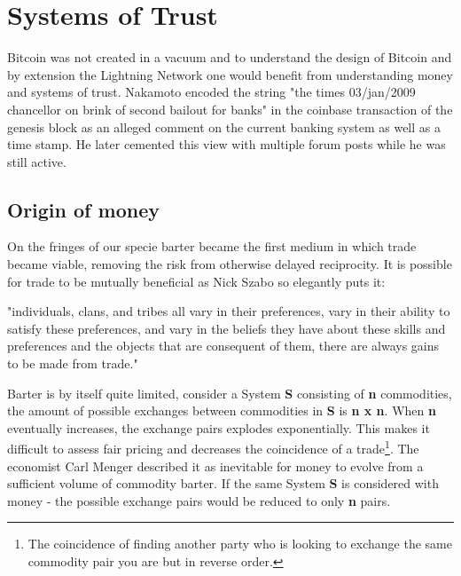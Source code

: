 \section{Systems of Trust}
\label{sec:macroeconomics}

Bitcoin was not created in a vacuum and to understand the design of Bitcoin and by extension the Lightning Network one would
benefit from understanding money and systems of trust. Nakamoto encoded the string "the times 03/jan/2009 chancellor on brink of second bailout for banks"\cite{repository:bitcoin:sourceforge}\cite{bitcoin:genesis:coinbase} in the coinbase transaction of the genesis block as an alleged comment on the current banking system as well as a time stamp. He later cemented this view with multiple forum posts while he was still active\cite{nakamoto:post:deflation}\cite{nakamoto:govern:print}.

\subsection{Origin of money}

On the fringes of our specie barter became the first medium in which trade became viable, removing the risk from otherwise delayed reciprocity. It is possible for trade to be mutually beneficial as Nick Szabo so elegantly puts it:

\begin{displayquote}

"individuals, clans, and tribes all vary in their preferences, vary in their ability to satisfy these preferences, and vary in the beliefs they have about these skills and preferences and the objects that are consequent of them, there are always gains to be made from trade."\cite{szabo:shelling:out}

\end{displayquote}

Barter is by itself quite limited, consider a System \textbf{S}
consisting of \textbf{n} commodities, the amount of possible exchanges between commodities in \textbf{S} is \textbf{n x n}. When \textbf{n} eventually increases, the exchange pairs explodes exponentially. This makes it difficult to assess fair pricing and decreases the coincidence of a trade\footnote{The coincidence of finding another party who is looking to exchange the same commodity pair you are but in reverse order.}. The economist Carl Menger described it as inevitable for money to evolve from a sufficient volume of commodity barter\cite{menger:origins:money}. If the same System \textbf{S} is considered with money - the possible exchange pairs would be reduced to only \textbf{n} pairs. 

